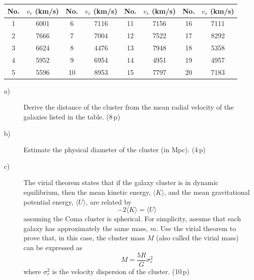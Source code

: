 \begin{center}
\begin{tabular}{cc|cc|cc|cc}
No. & $v_r$ (km/s) & No. & $v_r$ (km/s) & No. & $v_r$ (km/s) &
No. & $v_r$ (km/s) \\
\hline
1 & 6001 &  6 & 7116 & 11 & 7156 & 16 & 7111 \\
2 & 7666 &  7 & 7004 & 12 & 7522 & 17 & 8292 \\
3 & 6624 &  8 & 4476 & 13 & 7948 & 18 & 5358 \\
4 & 5952 &  9 & 6954 & 14 & 4951 & 19 & 4957 \\
5 & 5596 & 10 & 8953 & 15 & 7797 & 20 & 7183 \\
\end{tabular}
\end{center}

\begin{description}
\item[a)] Derive the distance of the cluster from the mean radial velocity of
  the galaxies listed in the table. \hfill(8\,p)
\item[b)] Estimate the physical diameter of the cluster (in Mpc).
  \hfill(4\,p)
\item[c)] The virial theorem states that if the galaxy cluster is in dynamic
  equilibrium, then the mean kinetic energy, $\langle K\rangle$, and the mean
  gravitational potential energy, $\langle U\rangle$, are related by
  \[ -2\langle K\rangle = \langle U\rangle \]
  assuming the Coma cluster is spherical. For simplicity, assume that each
  galaxy has approximately the same mass, $m$. Use the virial theorem to prove
  that, in this case, the cluster mass $M$ (also called the virial mass) can
  be expressed as
  \[ M = \frac{5R}{G}\sigma_r^2 \]
  where $\sigma_r^2$ is the velocity dispersion of the cluster. \hfill(10\,p)


\end{description}
